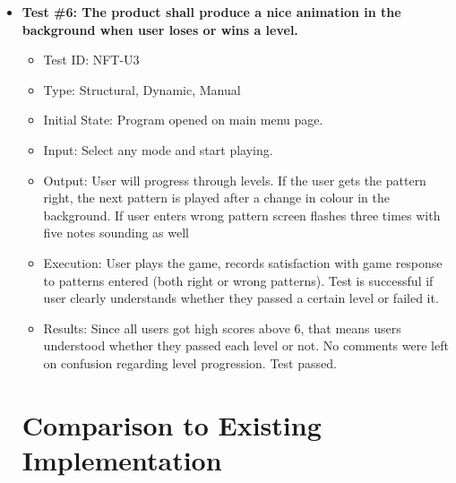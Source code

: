 \documentclass[12pt, titlepage]{article}
\begin{document}
\begin{itemize}
\item \textbf{Test \#6: The product shall produce a nice animation in the background when user loses or wins a level.}
\begin{itemize}
\item Test ID: NFT-U3
\item Type: Structural, Dynamic, Manual				
\item Initial State: Program opened on main menu page.		
\item Input: Select any mode and start playing.
\item Output: User will progress through levels. If the user gets the pattern right, the next pattern is played after a change in colour in the background. If user enters wrong pattern screen flashes three times with five notes sounding as well
\item Execution: User plays the game, records satisfaction with game response to patterns entered (both right or wrong patterns). Test is successful if user clearly understands whether they passed a certain level or failed it.
\item Results: Since all users got high scores above 6, that means users understood whether they passed each level or not. No comments were left on confusion regarding level progression. Test passed.
\end{itemize}


	
\section{Comparison to Existing Implementation}	


\end{itemize}
\end{document}
